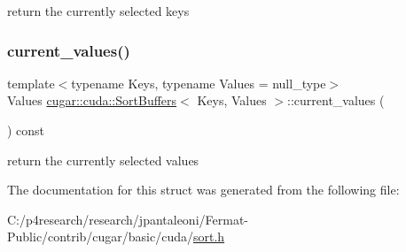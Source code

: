 return the currently selected keys \mbox{\label{structcugar_1_1cuda_1_1_sort_buffers_a7d60fa78c28cc62db8b564323454bf3b}} 
\subsubsection{\texorpdfstring{current\+\_\+values()}{current\_values()}}
{\footnotesize\ttfamily template$<$typename Keys, typename Values = null\+\_\+type$>$ \\
Values \hyperlink{structcugar_1_1cuda_1_1_sort_buffers}{cugar\+::cuda\+::\+Sort\+Buffers}$<$ Keys, Values $>$\+::current\+\_\+values (\begin{DoxyParamCaption}{ }\end{DoxyParamCaption}) const\hspace{0.3cm}{\ttfamily [inline]}}

return the currently selected values 

The documentation for this struct was generated from the following file\+:\begin{DoxyCompactItemize}
\item 
C\+:/p4research/research/jpantaleoni/\+Fermat-\/\+Public/contrib/cugar/basic/cuda/\hyperlink{sort_8h}{sort.\+h}\end{DoxyCompactItemize}
